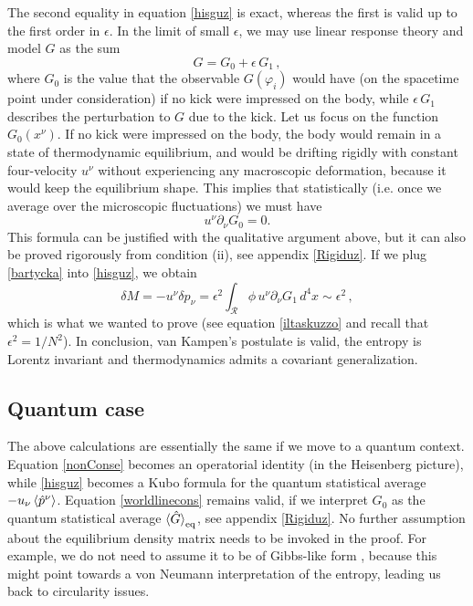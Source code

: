 \documentclass[twocolumn,usenatbib]{mnras2}
\begin{document}
The second equality in equation \eqref{hisguz} is exact, whereas the first is valid up to the first order in $\epsilon$. In the limit of small $\epsilon$, we may use linear response theory and model $G$ as the sum
\begin{equation}\label{bartycka}
    G=G_0 + \epsilon \, G_1 \, ,
\end{equation}
where $G_0$ is the value that the observable $G(\varphi_i)$ would have (on the spacetime point under consideration) if no kick were impressed on the body, while $\epsilon \, G_1$ describes the perturbation to $G$ due to the kick. Let us focus on the function $G_0(x^\nu)$. If no kick were impressed on the body, the body would remain in a state of thermodynamic equilibrium, and would be drifting rigidly with constant four-velocity $u^\nu$ without experiencing any macroscopic deformation, because it would keep the equilibrium shape. This implies that statistically (i.e. once we average over the microscopic fluctuations) we must have 
\begin{equation}\label{worldlinecons}
    u^\nu \partial_\nu G_0=0.
\end{equation} 
This formula can be justified with the qualitative argument above, but it can also be proved rigorously from condition (ii), see appendix \ref{Rigiduz}. If we plug \eqref{bartycka} into \eqref{hisguz}, we obtain
\begin{equation}
   \delta M = -u^\nu \delta p_\nu =  \epsilon^2 \int_{\mathcal{R}}   \phi \, u^\nu \partial_\nu G_1 \, d^4 x  \sim \epsilon^2  \, ,
\end{equation}
which is what we wanted to prove (see equation \eqref{iltaskuzzo} and recall that $\epsilon^2 = 1/N^2$). In conclusion, van Kampen's postulate is valid, the entropy is Lorentz invariant and thermodynamics admits a covariant generalization.


\subsection{Quantum case}

The above calculations are essentially the same if we move to a quantum context. Equation \eqref{nonConse} becomes an operatorial identity (in the Heisenberg picture), while \eqref{hisguz} becomes a Kubo formula for the quantum statistical average $-u_\nu \braket{\hat{p}^\nu}$. Equation \eqref{worldlinecons} remains valid, if we interpret $G_0$ as the quantum statistical average $\braket{\hat{G}}_{\text{eq}}$, see appendix \ref{Rigiduz}. No further assumption about the equilibrium density matrix needs to be invoked in the proof. For example, we do not need to assume it to be of Gibbs-like form \citep{Gogoglin2016}, because this might point towards a von Neumann interpretation of the entropy, leading us back to circularity issues.
\end{document}
